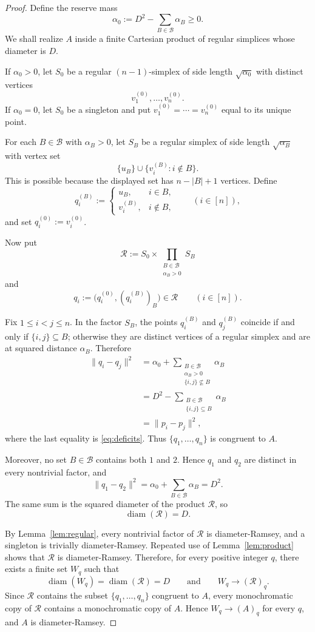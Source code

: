 \documentclass[preprint,12pt]{elsarticle}
\theoremstyle{remark}
\DeclareMathOperator{\diam}{diam}
\begin{document}
\begin{proof}
Define the reserve mass
\[
\alpha_0:=D^2-\sum_{B\in\mathcal B}\alpha_B\ge 0.
\]
We shall realize $A$ inside a finite Cartesian product of regular simplices whose diameter is $D$.

If $\alpha_0>0$, let $S_0$ be a regular $(n-1)$-simplex of side length $\sqrt{\alpha_0}$ with distinct vertices
\[
v_1^{(0)},\dots,v_n^{(0)}.
\]
If $\alpha_0=0$, let $S_0$ be a singleton and put $v_1^{(0)}=\cdots=v_n^{(0)}$ equal to its unique point.

For each $B\in\mathcal B$ with $\alpha_B>0$, let $S_B$ be a regular simplex of side length $\sqrt{\alpha_B}$ with vertex set
\[
\{u_B\}\cup\{v_i^{(B)}:i\notin B\}.
\]
This is possible because the displayed set has $n-|B|+1$ vertices. Define
\[
q_i^{(B)}:=
\begin{cases}
 u_B, & i\in B,\\[1mm]
 v_i^{(B)}, & i\notin B,
\end{cases}
\qquad (i\in[n]),
\]
and set $q_i^{(0)}:=v_i^{(0)}$.

Now put
\[
\mathcal R:=S_0\times \prod_{\substack{B\in\mathcal B\\ \alpha_B>0}} S_B
\]
and
\[
q_i:=\bigl(q_i^{(0)},(q_i^{(B)})_B\bigr)\in\mathcal R
\qquad (i\in[n]).
\]

Fix $1\le i<j\le n$. In the factor $S_B$, the points $q_i^{(B)}$ and $q_j^{(B)}$ coincide if and only if $\{i,j\}\subseteq B$; otherwise they are distinct vertices of a regular simplex and are at squared distance $\alpha_B$. Therefore
\begin{align*}
\|q_i-q_j\|^2
&=\alpha_0+
\sum_{\substack{B\in\mathcal B\\ \alpha_B>0\\ \{i,j\}\nsubseteq B}}\alpha_B \\
&=D^2-
\sum_{\substack{B\in\mathcal B\\ \{i,j\}\subseteq B}}\alpha_B \\
&=\|p_i-p_j\|^2,
\end{align*}
where the last equality is \eqref{eq:deficits}. Thus $\{q_1,\dots,q_n\}$ is congruent to $A$.

Moreover, no set $B\in\mathcal B$ contains both $1$ and $2$. Hence $q_1$ and $q_2$ are distinct in every nontrivial factor, and
\[
\|q_1-q_2\|^2
=\alpha_0+
\sum_{B\in\mathcal B}\alpha_B
=D^2.
\]
The same sum is the squared diameter of the product $\mathcal R$, so
\[
\diam(\mathcal R)=D.
\]

By Lemma~\ref{lem:regular}, every nontrivial factor of $\mathcal R$ is diameter-Ramsey, and a singleton is trivially diameter-Ramsey. Repeated use of Lemma~\ref{lem:product} shows that $\mathcal R$ is diameter-Ramsey. Therefore, for every positive integer $q$, there exists a finite set $W_q$ such that
\[
\diam(W_q)=\diam(\mathcal R)=D
\qquad\text{and}\qquad
W_q\to(\mathcal R)_q.
\]
Since $\mathcal R$ contains the subset $\{q_1,\dots,q_n\}$ congruent to $A$, every monochromatic copy of $\mathcal R$ contains a monochromatic copy of $A$. Hence $W_q\to(A)_q$ for every $q$, and $A$ is diameter-Ramsey.
\end{proof}
\end{document}
